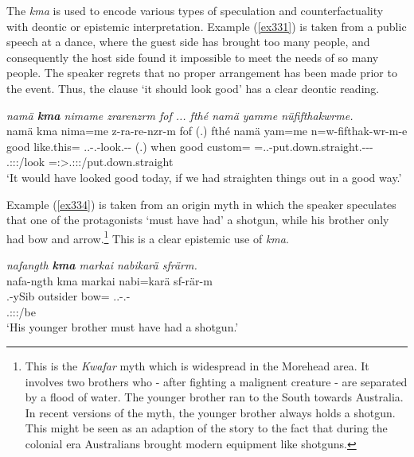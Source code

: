 The   \emph{kma} is used to encode various types of speculation and counterfactuality with deontic or epistemic interpretation. Example (\ref{ex331}) is taken from a public speech at a dance, where the guest side has brought too many people, and consequently the host side found it impossible to meet the needs of so many people. The speaker regrets that no proper arrangement has been made prior to the event. Thus, the clause `it should look good' has a clear deontic reading.

\begin{exe}
 	\ex \emph{namä \textbf{kma} nimame zrarenzrm fof ... fthé namä yamme nüfifthakwrme.}\\
 	\glll namä kma nima=me z-ra-re-nzr-m fof (.) fthé namä yam=me n=w-fifthak-wr-m-e\\
 	good \Pot{} like.this=\Ins{} \Tsg.\F.\Bet-\Irr.\Vc-look.\Ext-\Ndu-\Dur{} \Emph{} (.) when good custom=\Ins{} \Immpst=\Tsg.\F.\Alph-put.down.straight.\Ext-\Ndu-\Dur-\Fnsg{}\\
	{} {} {} \footnotesize{\Tsg.\F:\Sbj:\Irr:\Ipfv/look} {} {} {} {} {} \footnotesize{\Immpst=\Fpl:\Sbj>\Tsg.\F:\Obj:\Nonpast:\Dur/put.down.straight}\\
	\trans `It would have looked good today, if we had straighten things out in a good way.'
	\label{ex331}
\end{exe}

Example (\ref{ex334}) is taken from an origin myth in which the speaker speculates that one of the protagonists `must have had' a shotgun, while his brother only had bow and arrow.\footnote{This is the \emph{Kwafar} myth which is widespread in the Morehead area. It involves two brothers who - after fighting a malignent creature - are separated by a flood of water. The younger brother ran to the South towards Australia. In recent versions of the myth, the younger brother always holds a shotgun. This might be seen as an adaption of the story to the fact that during the colonial era Australians brought modern equipment like shotguns.} This is a clear epistemic use of \emph{kma}.

\begin{exe}
	\ex \emph{nafangth \textbf{kma} markai nabikarä sfrärm.}\\
	\glll nafa-ngth kma markai nabi=karä sf-rär-m\\
	\Third.\Poss{}-ySib \Pot{} outsider bow=\Prop{} \Tsg.\Masc.\Betatwo-\Cop.\Ndu-\Dur\\
	{} {} {} {} \footnotesize{\Tsg.\Masc:\Sbj:\Pst:\Dur/be}\\
	\trans `His younger brother must have had a shotgun.'
	\label{ex334}
\end{exe}

